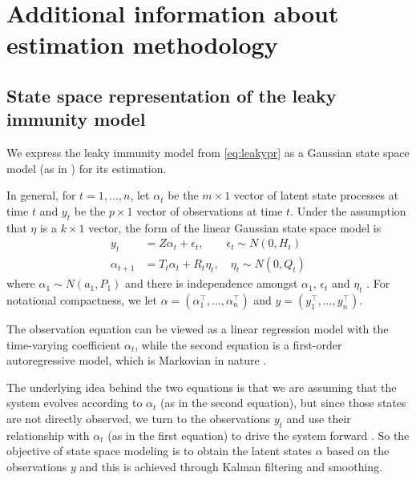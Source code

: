 \documentclass{article}
\begin{document}
\section{Additional information about estimation methodology}

\subsection{State space representation of the leaky immunity model}

We express the leaky immunity model from \autoref{eq:leakypr}
as a Gaussian state space model (as in \citealp{durbin2012time, helske2017kfas})
for its estimation.

In general, for $t = 1, \dots, n$, let $\alpha_t$ be the $m \times 1$ vector of latent
state processes at time $t$ and $y_t$ be the $p \times 1$ vector of observations
at time $t$. Under the assumption that $\eta$ is a $k \times 1$ vector, the
form of the linear Gaussian state space model is 
\begin{align}
y_t &= Z\alpha_t + \epsilon_t, \qquad \epsilon_t \sim N(0, H_t) \label{eq:ss1}\\
\alpha_{t+1} &= T_t\alpha_t + R_t\eta_t, \quad \eta_t \sim N(0, Q_t) \label{eq:ss2}
\end{align}
where $\alpha_1 \sim N(a_1, P_1)$ and 
there is independence amongst $\alpha_1$, $\epsilon_t$ and $\eta_t$
\citep{helske2017kfas, durbin2012time}. For notational
compactness, we let $\alpha = \left ( \alpha_1^\top, \dots, \alpha_n^\top \right )$
and $y = \left ( y_1^\top, \dots, y_n^\top \right )$.

The observation equation can be viewed as a linear regression model with the
time-varying coefficient $\alpha_t$, while the second equation is a first-order
autoregressive model, which is Markovian in nature \citep{durbin2012time}. 

The underlying idea behind the two equations is that we are assuming that the
system evolves according to $\alpha_t$ (as in the second equation), 
but since those states are
not directly observed, we turn to the observations $y_t$ and use their
relationship with $\alpha_t$ (as in the first equation) to drive the system
forward \citep{durbin2012time}. So the objective of state space modeling is to
obtain the latent states $\alpha$ based on the observations $y$ and this is
achieved through Kalman filtering and smoothing. 
\end{document}
